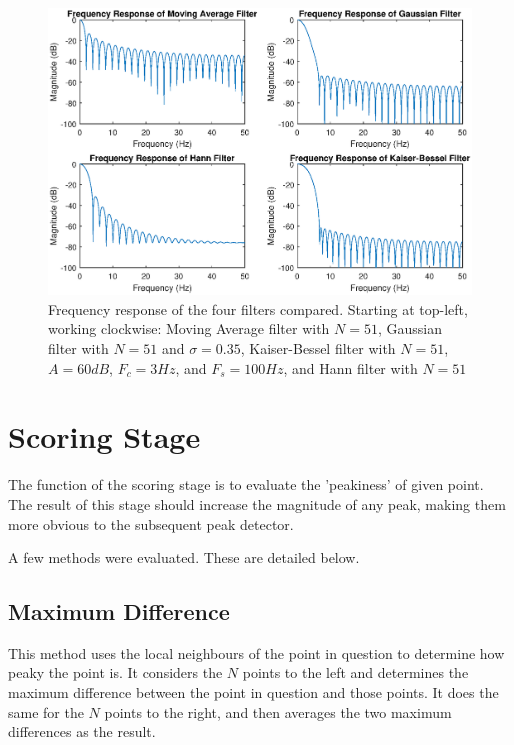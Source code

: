                 \begin{figure}[!th]
                    \includegraphics[width=\textwidth]{Images/compare_filters.eps}
                    \centering
                    \caption{Frequency response of the four filters compared. Starting at top-left, working clockwise: Moving Average filter with $N=51$, Gaussian filter with $N=51$ and $\sigma=0.35$, Kaiser-Bessel filter with $N=51$, $A=60dB$, $F_c = 3Hz$, and $F_s= 100Hz$, and Hann filter with $N=51$}
                    \label{img_compare_filters}
                \end{figure}  

        \section{Scoring Stage}

            The function of the scoring stage is to evaluate the 'peakiness' of given point. The result of this stage should increase the magnitude of any peak, making them more obvious to the subsequent peak detector.

            A few methods were evaluated. These are detailed below.

            \subsection{Maximum Difference}

                This method uses the local neighbours of the point in question to determine how peaky the point is. It considers the $N$ points to the left and determines the maximum difference between the point in question and those points. It does the same for the $N$ points to the right, and then averages the two maximum differences as the result.

